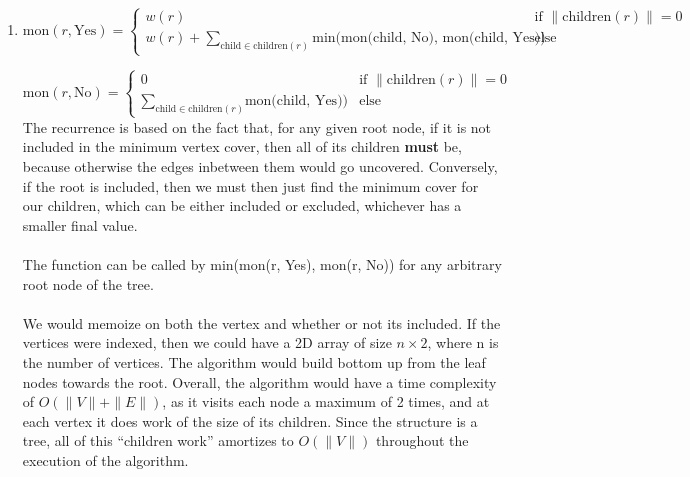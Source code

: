 
\usepackage{amsmath, verbatim, tikz, float, pgfplots, framed}
\usepackage[]{algorithm2e}

\usetikzlibrary{arrows,automata}

\oddsidemargin 0in
\evensidemargin 0in
\textwidth 6.5in
\topmargin -0.5in
\textheight 9.0in
\newcommand{\norm}[1]{\left\lVert #1 \right\rVert}


\pagestyle{myheadings}

\begin{enumerate}
\item
  \begin{displaymath}
    \text{mon}(r, \text{Yes}) = \left\{
      \begin{array}{lr}
        w(r) & \text {if } \|\text{children}(r)\| = 0\\
        w(r) + \sum_{\text{child} \in \text{children}(r)}\text{min(mon(child, No), mon(child, Yes))} & \text{else}
      \end{array}
      \right.
  \end{displaymath}  

  \begin{displaymath}
    \text{mon}(r, \text{No}) = \left\{
      \begin{array}{lr}
        0 & \text {if } \|\text{children}(r)\| = 0\\
        \sum_{\text{child} \in \text{children}(r)}\text{mon(child, Yes))} & \text{else}
      \end{array}
      \right.
   \end{displaymath}
   The recurrence is based on the fact that, for any given root node, if it is not included in the minimum vertex cover, then all of its children \textbf{must} be, because otherwise the edges inbetween them would go uncovered. Conversely, if the root is included, then we must then just find the minimum cover for our children, which can be either included or excluded, whichever has a smaller final value.\\\\
   The function can be called by min(mon(r, Yes), mon(r, No)) for any arbitrary root node of the tree.\\\\
   We would memoize on both the vertex and whether or not its included. If the vertices were indexed, then we could have a 2D array of size $n\times2$, where n is the number of vertices. The algorithm would build bottom up from the leaf nodes towards the root. Overall, the algorithm would have a time complexity of $O(\|V\| + \|E\|)$, as it visits each node a maximum of 2 times, and at each vertex it does work of the size of its children. Since the structure is a tree, all of this ``children work'' amortizes to $O(\|V\|)$ throughout the execution of the algorithm.
\end{enumerate}

